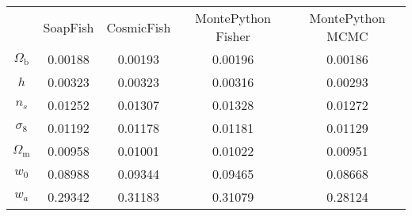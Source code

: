\begin{table}
\centering
\begin{tabular}{|c|c|c|c|c|}
 & SoapFish & CosmicFish & MontePython Fisher & MontePython MCMC \\
$\Omega_\mathrm{b}$ & 0.00188 & 0.00193 & 0.00196 & 0.00186 \\
$h$ & 0.00323 & 0.00323 & 0.00316 & 0.00293 \\
$n_s$ & 0.01252 & 0.01307 & 0.01328 & 0.01272 \\
$\sigma_8$ & 0.01192 & 0.01178 & 0.01181 & 0.01129 \\
$\Omega_\mathrm{m}$ & 0.00958 & 0.01001 & 0.01022 & 0.00951 \\
$w_0$ & 0.08988 & 0.09344 & 0.09465 & 0.08668 \\
$w_a$ & 0.29342 & 0.31183 & 0.31079 & 0.28124 \\
\end{tabular}
\end{table}
